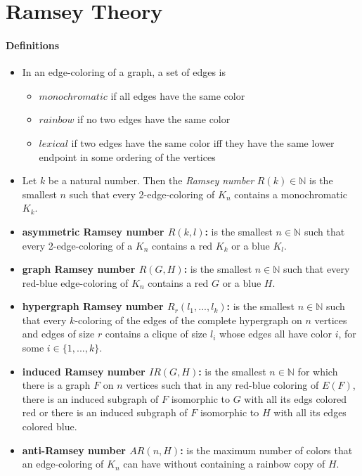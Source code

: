 \section{Ramsey Theory}

\paragraph{Definitions}
\begin{itemize}
    \item In an edge-coloring of a graph, a set of edges is 
        \begin{itemize}
            \item $monochromatic$ if all edges have the same color
            \item $rainbow$ if no two edges have the same color
            \item $lexical$ if two edges have the same color iff
            they have the same lower endpoint in some ordering of 
            the vertices 
        \end{itemize}

    \item Let $k$ be a natural number. Then the \textit{Ramsey number}
    $R(k) \in \mathbb{N}$ is the smallest $n$ such that every 
    2-edge-coloring of $K_n$ contains a monochromatic $K_k$.

    \item \textbf{asymmetric Ramsey number $R(k,l)$:} is the smallest 
    $n\in\mathbb{N}$ such that every 2-edge-coloring of a $K_n$ contains 
    a red $K_k$ or a blue $K_l$. 

    \item \textbf{graph Ramsey number $R(G,H)$:} is the smallest
    $n\in\mathbb{N}$ such that every red-blue edge-coloring of $K_n$ 
    contains a red $G$ or a blue $H$.

    \item \textbf{hypergraph Ramsey number $R_r(l_1,...,l_k)$:} is the smallest 
    $n\in\mathbb{N}$ such that every $k$-coloring of the edges of the 
    complete hypergraph on $n$ vertices and edges of size $r$ contains 
    a clique of size $l_i$ whose edges all have color $i$, for some 
    $ i \in \{1,...,k\}$.

    \item \textbf{induced Ramsey number $IR(G,H)$:} is the smallest $n \in 
    \mathbb{N}$ for which there is a graph $F$ on $n$ vertices such that in any 
    red-blue coloring of $E(F)$, there is an induced
    subgraph of $F$ isomorphic to $G$ with all 
    its edgs colored red or there is an induced subgraph of $F$ isomorphic to 
    $H$ with all its edges colored blue.

    \item \textbf{anti-Ramsey number $AR(n,H)$:} is the maximum number of colors
    that an edge-coloring of $K_n$ can have without containing a rainbow copy 
    of $H$.
\end{itemize}


